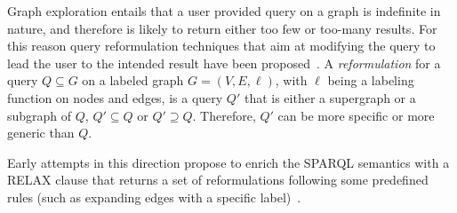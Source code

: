 



Graph exploration entails that a user provided query on a graph is indefinite in nature, and therefore is likely to return either too few or too-many results. 
For this reason query reformulation techniques that aim at modifying the query to lead the user to the intended result have been proposed~\citep{mottin2015graph,hurtado2008query}. 
A \emph{reformulation} for a query $Q \subseteq G$ on a labeled graph $G = (V, E, \ell)$, with $\ell$ being a labeling function on nodes and edges, is a query $Q'$ that is either a supergraph or a subgraph of $Q$, $Q' \subseteq Q$ or $Q' \supseteq Q$. 
Therefore, $Q'$ can be more specific or more generic than $Q$. 

Early attempts in this direction propose to enrich the SPARQL semantics with a \textsc{RELAX} clause that returns a set of reformulations following some predefined rules (such as expanding edges with a specific label)~\citep{hurtado2008query}.




